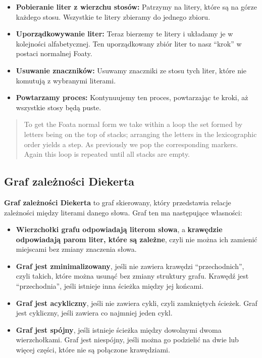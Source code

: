 \documentclass[11pt]{article}
\begin{document}
\begin{itemize}
\item
  \textbf{Pobieranie liter z wierzchu stosów:} Patrzymy na litery, które
  są na górze każdego stosu. Wszystkie te litery zbieramy do jednego
  zbioru.
\item
  \textbf{Uporządkowywanie liter:} Teraz bierzemy te litery i układamy
  je w kolejności alfabetycznej. Ten uporządkowany zbiór liter to nasz
  ``krok'' w postaci normalnej Foaty.
\item
  \textbf{Usuwanie znaczników:} Usuwamy znaczniki ze stosu tych liter,
  które nie komutują z wybranymi literami.
\item
  \textbf{Powtarzamy proces:} Kontynuujemy ten proces, powtarzając te
  kroki, aż wszystkie stosy będą puste.
\end{itemize}

\begin{quote}
To get the Foata normal form we take within a loop the set formed by
letters being on the top of stacks; arranging the letters in the
lexicographic order yields a step. As previously we pop the
corresponding markers. Again this loop is repeated until all stacks are
empty.
\end{quote}

    \hypertarget{graf-zaleux17cnoux15bci-diekerta}{%
\subsection{Graf zależności
Diekerta}\label{graf-zaleux17cnoux15bci-diekerta}}

\textbf{Graf zależności Diekerta} to graf skierowany, który przedstawia
relacje zależności między literami danego słowa. Graf ten ma następujące
własności:

\begin{itemize}
\item
  \textbf{Wierzchołki grafu odpowiadają literom słowa}, a
  \textbf{krawędzie odpowiadają parom liter, które są zależne}, czyli
  nie można ich zamienić miejscami bez zmiany znaczenia słowa.
\item
  \textbf{Graf jest zminimalizowany}, jeśli nie zawiera krawędzi
  ``przechodnich'', czyli takich, które można usunąć bez zmiany
  struktury grafu. Krawędź jest ``przechodnia'', jeśli istnieje inna
  ścieżka między jej końcami.
\item
  \textbf{Graf jest acykliczny}, jeśli nie zawiera cykli, czyli
  zamkniętych ścieżek. Graf jest cykliczny, jeśli zawiera co najmniej
  jeden cykl.
\item
  \textbf{Graf jest spójny}, jeśli istnieje ścieżka między dowolnymi
  dwoma wierzchołkami. Graf jest niespójny, jeśli można go podzielić na
  dwie lub więcej części, które nie są połączone krawędziami.
\end{itemize}
\end{document}

